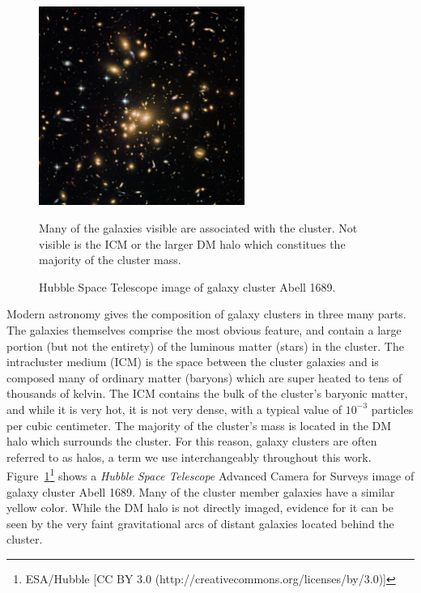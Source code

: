 \begin{figure}[ht]
	\begin{center}
		\includegraphics[width=0.6\textwidth]{figures/abell1689_hubble.pdf} 
	\end{center}
	\singlespace
	\caption{Hubble Space Telescope image of galaxy cluster Abell 1689.} Many of the galaxies visible are associated with the cluster. Not visible is the ICM or the larger DM halo which constitues the majority of the cluster mass.
	\label{fig: abell1689_hubble} 
\end{figure}

Modern astronomy gives the composition of galaxy clusters in three many parts. The galaxies themselves comprise the most obvious feature, and contain a large portion (but not the entirety) of the luminous matter (stars) in the cluster. The intracluster medium (ICM) is the space between the cluster galaxies and is composed many of ordinary matter (baryons) which are super heated to tens of thousands of kelvin. The ICM contains the bulk of the cluster's baryonic matter, and while it is very hot, it is not very dense, with a typical value of $10^{-3}$ particles per cubic centimeter. The majority of the cluster's mass is located in the DM halo which surrounds the cluster. For this reason, galaxy clusters are often referred to as halos, a term we use interchangeably throughout this work. Figure~\ref{fig: abell1689_hubble}\footnote{ESA/Hubble [CC BY 3.0 (http://creativecommons.org/licenses/by/3.0)]} shows a \emph{Hubble Space Telescope} Advanced Camera for Surveys image of galaxy cluster Abell 1689. Many of the cluster member galaxies have a similar yellow color. While the DM halo is not directly imaged, evidence for it can be seen by the very faint gravitational arcs of distant galaxies located behind the cluster.

